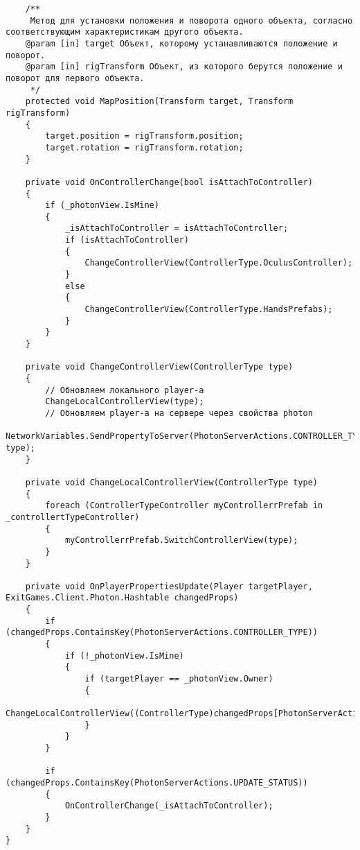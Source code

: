 \begin{verbatim}
    /**
     Метод для установки положения и поворота одного объекта, согласно соответствующим характеристикам другого объекта.
    @param [in] target Объект, которому устанавливаются положение и поворот.
    @param [in] rigTransform Объект, из которого берутся положение и поворот для первого объекта.
     */
    protected void MapPosition(Transform target, Transform rigTransform)
    {
        target.position = rigTransform.position;
        target.rotation = rigTransform.rotation;
    }

    private void OnControllerChange(bool isAttachToController)
    {
        if (_photonView.IsMine)
        {
            _isAttachToController = isAttachToController;
            if (isAttachToController)
            {
                ChangeControllerView(ControllerType.OculusController);
            }
            else
            {
                ChangeControllerView(ControllerType.HandsPrefabs);
            }
        }
    }

    private void ChangeControllerView(ControllerType type)
    {
        // Обновляем локального player-a
        ChangeLocalControllerView(type);
        // Обновляем player-a на сервере через свойства photon
        NetworkVariables.SendPropertyToServer(PhotonServerActions.CONTROLLER_TYPE, type);
    }

    private void ChangeLocalControllerView(ControllerType type)
    {
        foreach (ControllerTypeController myControllerrPrefab in _controllertTypeController)
        {
            myControllerrPrefab.SwitchControllerView(type);
        }
    }

    private void OnPlayerPropertiesUpdate(Player targetPlayer, ExitGames.Client.Photon.Hashtable changedProps)
    {
        if (changedProps.ContainsKey(PhotonServerActions.CONTROLLER_TYPE))
        {
            if (!_photonView.IsMine)
            {
                if (targetPlayer == _photonView.Owner)
                {
                    ChangeLocalControllerView((ControllerType)changedProps[PhotonServerActions.CONTROLLER_TYPE]);
                }
            }
        }

        if (changedProps.ContainsKey(PhotonServerActions.UPDATE_STATUS))
        {
            OnControllerChange(_isAttachToController);
        }
    }
}

\end{verbatim}
